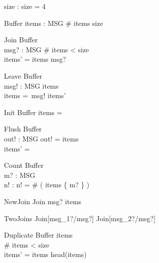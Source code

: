 

\begin{zed}
[ MSG ]
\end{zed}

\begin{axdef}
size : \nat 
\where
size = 4
\end{axdef}

\begin{schema}{Buffer}
items : \seq MSG 
\where
\# items \leq size
\end{schema}

\begin{schema}{Join}
\Delta Buffer \\
msg? : MSG 
\where
\# items < size \\
items' = items \cat \langle msg? \rangle
\end{schema}

\begin{schema}{Leave}
 \Delta Buffer \\
 msg! : MSG 
\where
 items \neq \emptyset \\
 items =~\langle msg! \rangle \cat items'
\end{schema}

\begin{schema}{Init}
 Buffer 
\where
 items =~\langle \rangle
\end{schema}

\begin{schema}{Flush}
 \Delta Buffer \\
 out! : \seq MSG 
\where
 out! = items \\
 items' = \langle \rangle
\end{schema}

\begin{schema}{Count}
 \Xi Buffer \\
 m? : MSG \\
 n! : \nat 
\where
 n! = \# ( items \rres \{ m? \} )
\end{schema}

\begin{schema}{NewJoin}
  Join
\where
  msg? \notin \ran items
\end{schema}

\begin{zed}
TwoJoins  Join[msg_1?/msg?] \semi Join[msg_2?/msg?]
\end{zed}

\begin{schema}{Duplicate}
  \Delta Buffer
\where
  items \neq  \langle \rangle \\
  \# items < size\\
  items' = items \cat \langle head(items) \rangle 
\end{schema}

